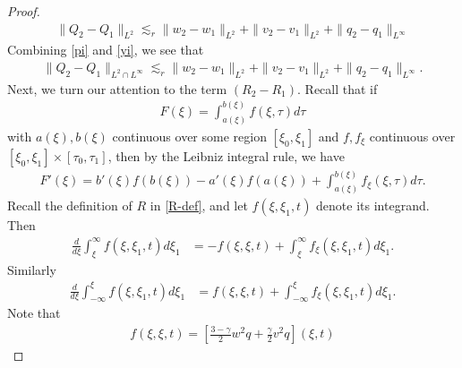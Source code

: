\documentclass[12pt,reqno]{amsart}
\numberwithin{equation}{section}  %
\numberwithin{figure}{section}
\begin{document}
\begin{proof}
\begin{equation}
  \label{yi}
\begin{split}
  \| Q_{2} - Q_{1} \|_{L^{2}} \lesssim_{r} \| w_{2} - w_{1} \|_{L^{2}} + \| v_{2} - v_{1} \|_{L^{2}} + \| q_{2} - q_{1} \|_{L^{\infty}}
\end{split}
\end{equation}
%
%
Combining \eqref{pi} and \eqref{yi}, we see that
%
%
\begin{equation}
  \label{Q-diff-fin-est}
\begin{split}
  \| Q_{2} - Q_{1} \|_{L^{2} \cap L^{\infty}} \lesssim_{r} \| w_{2} - w_{1} \|_{L^{2}} + \| v_{2} - v_{1}
  \|_{L^{2}} + \| q_{2} - q_{1} \|_{L^{\infty}}.
\end{split}
\end{equation}
%
%
Next, we turn our attention to the term 
$(R_{2} - R_{1})$. Recall that if
%
%
\begin{equation*}
\begin{split}
F(\xi) = \int_{a(\xi)}^{b(\xi)} f(\xi, \tau) d \tau
\end{split}
\end{equation*}
%
%
with $a(\xi), b(\xi)$ continuous over some region $[\xi_{0}, \xi_{1}]$ and $f, f_{\xi}$ continuous over $[\xi_{0}, \xi_{1}] \times [\tau_{0}, \tau_{1}]$, then by the Leibniz integral rule, we have
%
%
\begin{equation*}
\begin{split}
F'(\xi) = b'(\xi) f(b(\xi)) - a'(\xi) f(a(\xi)) + \int_{a(\xi)}^{b(\xi)} f_{\xi}(\xi, \tau) d \tau.
\end{split}
\end{equation*}
%
%
Recall the definition of $R$ in \eqref{R-def}, and let $f(\xi, \xi_{1}, t)$ denote
its integrand. Then
%
%
\begin{equation*}
\begin{split}
\frac{d}{d \xi} \int_{\xi}^{\infty}f(\xi, \xi_{1}, t) d \xi_{1}
& = -f(\xi, \xi, t) + \int_{\xi}^{\infty} f_{\xi}(\xi, \xi_{1}, t) d \xi_{1}.
\end{split}
\end{equation*}
%
%
Similarly
\begin{equation*}
\begin{split}
\frac{d}{d \xi} \int_{-\infty}^{\xi}f(\xi, \xi_{1}, t) d \xi_{1}
& = f(\xi, \xi, t) + \int_{-\infty}^{\xi} f_{\xi}(\xi, \xi_{1}, t) d \xi_{1}.
\end{split}
\end{equation*}
Note that
\begin{gather*}
    f(\xi, \xi, t) = \left [ \frac{3 - \gamma}{2}w^{2}q + \frac{\gamma}{2} v^{2} q \right ](\xi, t)

\end{gather*}
\end{proof}
\end{document}
